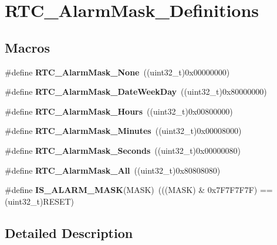 \hypertarget{group___r_t_c___alarm_mask___definitions}{}\section{R\+T\+C\+\_\+\+Alarm\+Mask\+\_\+\+Definitions}
\label{group___r_t_c___alarm_mask___definitions}
\subsection*{Macros}
\begin{DoxyCompactItemize}
\item 
\hypertarget{group___r_t_c___alarm_mask___definitions_ga64ab58463d1595424151b6043f5c9650}{}\#define {\bfseries R\+T\+C\+\_\+\+Alarm\+Mask\+\_\+\+None}~((uint32\+\_\+t)0x00000000)\label{group___r_t_c___alarm_mask___definitions_ga64ab58463d1595424151b6043f5c9650}

\item 
\hypertarget{group___r_t_c___alarm_mask___definitions_gae172289e90e0b7ffaebc1fab3183d8f6}{}\#define {\bfseries R\+T\+C\+\_\+\+Alarm\+Mask\+\_\+\+Date\+Week\+Day}~((uint32\+\_\+t)0x80000000)\label{group___r_t_c___alarm_mask___definitions_gae172289e90e0b7ffaebc1fab3183d8f6}

\item 
\hypertarget{group___r_t_c___alarm_mask___definitions_ga458d363397ba3c1b7bc77543b32f0e7b}{}\#define {\bfseries R\+T\+C\+\_\+\+Alarm\+Mask\+\_\+\+Hours}~((uint32\+\_\+t)0x00800000)\label{group___r_t_c___alarm_mask___definitions_ga458d363397ba3c1b7bc77543b32f0e7b}

\item 
\hypertarget{group___r_t_c___alarm_mask___definitions_gad9433880f20b69b62ac8fe35e133b205}{}\#define {\bfseries R\+T\+C\+\_\+\+Alarm\+Mask\+\_\+\+Minutes}~((uint32\+\_\+t)0x00008000)\label{group___r_t_c___alarm_mask___definitions_gad9433880f20b69b62ac8fe35e133b205}

\item 
\hypertarget{group___r_t_c___alarm_mask___definitions_ga8e70c31ba21d8504d2c1e8d6f7929c14}{}\#define {\bfseries R\+T\+C\+\_\+\+Alarm\+Mask\+\_\+\+Seconds}~((uint32\+\_\+t)0x00000080)\label{group___r_t_c___alarm_mask___definitions_ga8e70c31ba21d8504d2c1e8d6f7929c14}

\item 
\hypertarget{group___r_t_c___alarm_mask___definitions_gacbb8cfb5a883b02dd2c025f0745f9bdf}{}\#define {\bfseries R\+T\+C\+\_\+\+Alarm\+Mask\+\_\+\+All}~((uint32\+\_\+t)0x80808080)\label{group___r_t_c___alarm_mask___definitions_gacbb8cfb5a883b02dd2c025f0745f9bdf}

\item 
\hypertarget{group___r_t_c___alarm_mask___definitions_gac119b97b072bf9c12e008011ff202a19}{}\#define {\bfseries I\+S\+\_\+\+A\+L\+A\+R\+M\+\_\+\+M\+A\+S\+K}(M\+A\+S\+K)~(((M\+A\+S\+K) \& 0x7\+F7\+F7\+F7\+F) == (uint32\+\_\+t)\+R\+E\+S\+E\+T)\label{group___r_t_c___alarm_mask___definitions_gac119b97b072bf9c12e008011ff202a19}

\end{DoxyCompactItemize}


\subsection{Detailed Description}
